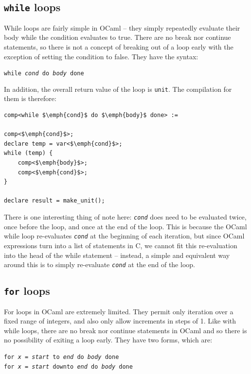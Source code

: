 \subsection{\texttt{while} loops}

While loops are fairly simple in OCaml -- they simply repeatedly evaluate their 
body while the condition evaluates to true. There are no break nor continue 
statements, so there is not a concept of breaking out of a loop early with the 
exception of setting the condition to false. They have the syntax:

\begin{center}
    \texttt{while \emph{cond} do \emph{body} done}
\end{center}

In addition, the overall return value of the loop is \texttt{unit}. The
compilation for them is therefore: 

\begin{lstlisting}
comp<while $\emph{cond}$ do $\emph{body}$ done> :=

comp<$\emph{cond}$>;
declare temp = var<$\emph{cond}$>;
while (temp) {
    comp<$\emph{body}$>;
    comp<$\emph{cond}$>;
}

declare result = make_unit();
\end{lstlisting}

There is one interesting thing of note here: \texttt{\emph{cond}} does need to 
be evaluated twice, once before the loop, and once at the end of the loop. This 
is because the OCaml while loop re-evaluates \texttt{\emph{cond}} at the 
beginning of each iteration, but since OCaml expressions turn into a list of 
statements in C, we cannot fit this re-evaluation into the head of the while 
statement -- instead, a simple and equivalent way around this is to simply 
re-evaluate \texttt{\emph{cond}} at the end of the loop.

\subsection{\texttt{for} loops}

For loops in OCaml are extremely limited. They permit only iteration over a 
fixed range of integers, and also only allow increments in steps of 1. Like 
with while loops, there are no break nor continue statements in OCaml and so 
there is no possibility of exiting a loop early. They have two forms, which are:

\begin{center}
\texttt{for \emph{x} = \emph{start} to \emph{end} do \emph{body} done}\\
\texttt{for \emph{x} = \emph{start} downto \emph{end} do \emph{body} done}\\
\end{center}

